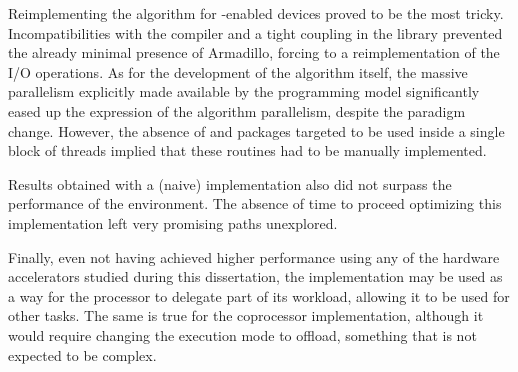 \documentclass[../thesis]{subfiles}
\begin{document}
	Reimplementing the algorithm for \cuda-enabled devices proved to be the most tricky. Incompatibilities with the compiler and a tight coupling in the library prevented the already minimal presence of Armadillo, forcing to a reimplementation of the I/O operations. As for the development of the algorithm itself, the massive parallelism explicitly made available by the \cuda programming model significantly eased up the expression of the algorithm parallelism, despite the paradigm change. However, the absence of \blas and \lapack packages targeted to be used inside a single block of threads implied that these routines had to be manually implemented.

	Results obtained with a (naive) \cuda implementation also did not surpass the performance of the \multicore environment. The absence of time to proceed optimizing this implementation left very promising paths unexplored.

	Finally, even not having achieved higher performance using any of the hardware accelerators studied during this dissertation, the \cuda implementation may be used as a way for the processor to delegate part of its workload, allowing it to be used for other tasks. The same is true for the coprocessor implementation, although it would require changing the execution mode to offload, something that is not expected to be complex.
\end{document}
